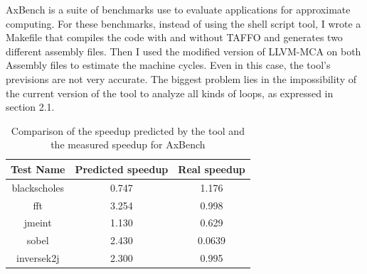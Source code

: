 AxBench is a suite of benchmarks use to evaluate applications for approximate computing.
For these benchmarks, instead of using the shell script tool, I wrote a Makefile that compiles the code with and without TAFFO and generates two different assembly files.
Then I used the modified version of LLVM-MCA on both Assembly files to estimate the machine cycles.
Even in this case, the tool's previsions are not very accurate.
The biggest problem lies in the impossibility of the current version of the tool to analyze all kinds of loops, as expressed in section 2.1.

\begin{table}[ht]
\begin{center}
\caption{Comparison of the speedup predicted by the tool and the measured speedup for AxBench}
\vspace{0.5cm}
\begin{tabular}{ |c|c|c| } 
 \hline
Test Name & Predicted speedup & Real speedup \\
 \hline
  blackscholes & 0.747 & 1.176 \\
 \hline
  fft & 3.254 & 0.998 \\
 \hline
  jmeint & 1.130 & 0.629\\
 \hline
  sobel & 2.430 & 0.0639 \\
 \hline
  inversek2j & 2.300 & 0.995 \\
 \hline
 \end{tabular}
\end{center}
\end{table}

\newpage

